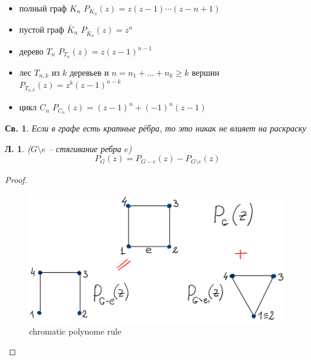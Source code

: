 \documentclass[a4paper,12pt]{article}
\newtheorem{property}{Св.}[definition]
\newtheorem{lemma}{Л.}[theorem]
\begin{document}
\begin{itemize}
	\item полный граф $K_n$ \quad $P_{K_n}(z) = z(z-1)\cdots(z-n+1)$
	\item пустой граф $\bar{K}_n$ \quad $P_{\overline{K}_n}(z) = z^n$
	\item дерево $T_n$ \quad $P_{T_n}(z) = z(z-1)^{n-1}$
	\item лес $T_{n,k}$ из $k$ деревьев и $n=n_1+\dots+n_k \geqslant k$ вершин \quad $P_{T_{n,k}}(z) = z^k(z-1)^{n-k}$
	\item цикл $C_{n}$ \quad $P_{C_{n}}(z) = (z-1)^n + (-1)^n(z-1)$
\end{itemize}

\begin{property}
	Если в графе есть кратные рёбра, то это никак не влияет на раскраску
\end{property}

\begin{lemma} ($G \setminus e$ -- стягивание ребра $e$)
	\[ P_{G}(z) = P_{G-e}(z) - P_{G \setminus e}(z) \]
\end{lemma}
\begin{proof}
	\begin{figure}
		\includegraphics[width=12cm]{chromatic-polynome-rule.png}
		\caption{chromatic polynome rule}
	\end{figure}
\end{proof}
\end{document}
